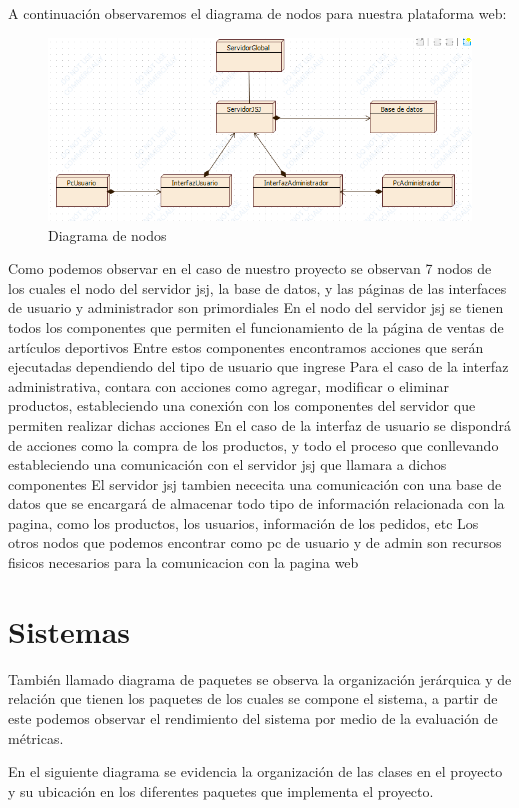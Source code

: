 A continuación observaremos el diagrama de nodos para nuestra plataforma web:

\begin{figure}[h]
	\centering
	\includegraphics[width=0.7\linewidth]{arquitectura/imagenes/DiagramaNodos}
	\caption{Diagrama de nodos}
	\label{fig:diagramanodos}
\end{figure}

Como podemos observar en el caso de nuestro proyecto se observan 7 nodos de los cuales el nodo del servidor jsj, la base de datos, y las páginas de las interfaces de usuario y administrador son primordiales
En el nodo del servidor jsj se tienen todos los componentes que permiten el funcionamiento de la página de ventas de artículos deportivos
Entre estos componentes encontramos acciones que serán ejecutadas dependiendo del tipo de usuario que ingrese
Para el caso de la interfaz administrativa, contara con acciones como agregar, modificar o eliminar productos, estableciendo una conexión con los componentes del servidor que permiten realizar dichas acciones
En el caso de la interfaz de usuario se dispondrá de acciones como la compra de los productos, y todo el proceso que conllevando estableciendo una comunicación con el servidor jsj que llamara a dichos componentes
El servidor jsj tambien nececita una comunicación con una base de datos que se encargará de almacenar todo tipo de información relacionada con la pagina, como los productos, los usuarios, información de los pedidos, etc
Los otros nodos que podemos encontrar como pc de usuario y de admin son recursos fisicos necesarios para la comunicacion con la pagina web
\newpage

\section{Sistemas}
También llamado diagrama de paquetes se observa la organización jerárquica y de relación que tienen los paquetes de los cuales se compone el sistema, a partir de este podemos observar el rendimiento del sistema por medio de la evaluación de métricas.

En el siguiente diagrama se evidencia la organización de las clases en el proyecto y su ubicación en los diferentes paquetes que implementa el proyecto.

